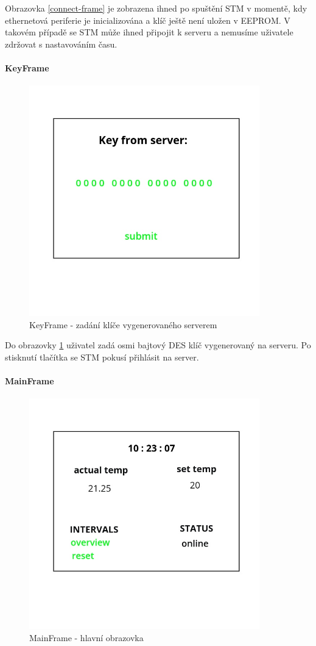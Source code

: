 Obrazovka \ref{connect-frame} je zobrazena ihned po spuštění STM v momentě, kdy ethernetová periferie je inicializována
a klíč ještě není uložen v EEPROM.
V takovém případě se STM může ihned připojit k serveru a nemusíme uživatele zdržovat s nastavováním
času.

\paragraph{KeyFrame}
\begin{figure}[H]\centering
\includegraphics[width=100mm, height=100mm]{../img/key_frame.jpg}
\caption{KeyFrame - zadání klíče vygenerovaného serverem}
\label{key-frame}
\end{figure}

Do obrazovky \ref{key-frame} uživatel zadá osmi bajtový DES klíč \cite{DES} vygenerovaný na serveru.
Po stisknutí tlačítka  se STM pokusí přihlásit na server.

\paragraph{MainFrame}
\begin{figure}[H]\centering
\includegraphics[width=100mm, height=100mm]{../img/main_frame_online.jpg}
\caption{MainFrame - hlavní obrazovka}
\label{main-frame}
\end{figure}

